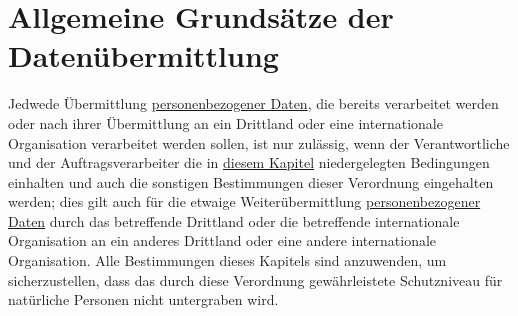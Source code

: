 \chapter{Allgemeine Grundsätze der Datenübermittlung}
\label{ch:44}


Jedwede Übermittlung \hyperref[itm:04-1]{personenbezogener Daten}, die bereits verarbeitet werden oder nach ihrer Übermittlung an ein
Drittland oder eine internationale Organisation verarbeitet werden sollen, ist nur zulässig, wenn der Verantwortliche
und der Auftragsverarbeiter die in \hyperref[part:5]{diesem Kapitel} niedergelegten Bedingungen einhalten und auch die
sonstigen Bestimmungen dieser Verordnung eingehalten werden; dies gilt auch für die etwaige Weiterübermittlung
\hyperref[itm:04-1]{personenbezogener Daten} durch das betreffende Drittland oder die betreffende internationale Organisation an ein anderes
Drittland oder eine andere internationale Organisation. Alle Bestimmungen dieses Kapitels sind anzuwenden, um
sicherzustellen, dass das durch diese Verordnung gewährleistete Schutzniveau für natürliche Personen nicht untergraben
wird.


